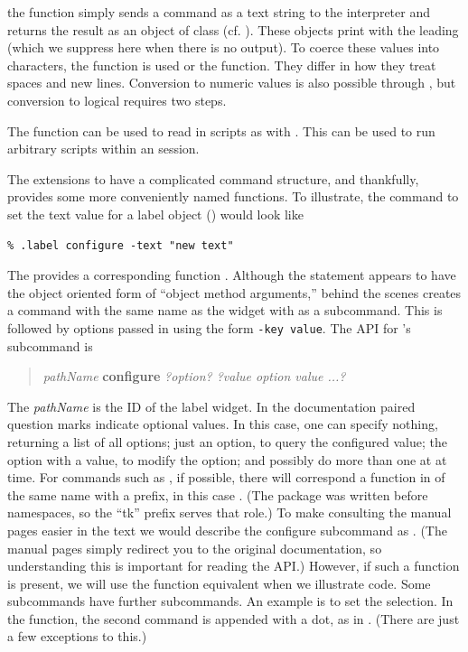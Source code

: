 the  function simply sends a command as a text string
to the \TCL\/ interpreter and returns the result as an object of class
 (cf. ). These objects print with the leading
 (which we suppress here when there is no output). To coerce
these values into characters, the  function is used or the  function. They differ in how they treat spaces and new lines. 
Conversion to numeric values is also possible through , but conversion to logical requires two steps.

The  function can be used to read in \TCL\/ scripts as with . This can be used to run arbitrary \TCL\/ scripts within an \R\/ session.

The \TK\/ extensions to \TCL\/ have a complicated command structure, and thankfully,  provides some more conveniently named functions. To illustrate, the \TCL\/ command to set the text value for a label object () would look like
\begin{verbatim}
% .label configure -text "new text"
\end{verbatim}
The  provides a corresponding function . 
Although the \TCL\/ statement appears to have the object oriented form of ``object method arguments,'' behind the scenes \TCL\/ creates a command with the same name as the widget with
 as a subcommand. This is followed by options 
passed in using the form \texttt{-key value}.  The \TK\/ API for 's  subcommand is

\begin{quotation}
  \textit{pathName} \textbf{configure} \textit{?option? ?value option value ...?}
\end{quotation}

The \textit{pathName} is the ID of the label widget. In the \TK\/ documentation
paired question marks indicate optional values. In this case, one can
specify nothing, returning a list of all options; just an option, to query the configured value; the option
with a value, to modify the option; and possibly do more than one at at time.
For commands such as , if possible, there will correspond a
function in \R\/ of the same name with a  prefix, in this case
.  (The package  was written before
namespaces, so the ``tk'' prefix serves that role.) To make consulting the \TK\/ manual pages easier in the text we would describe the configure subcommand as . (The \R\/ manual pages simply redirect you to the original \TK\/ documentation, so understanding this is important for reading the API.) However, if such a function is present, we will use the \R\/ function equivalent when we illustrate code. Some subcommands have further subcommands. An example is to set the selection. In the \R\/ function, the second command is appended with a dot, as in . (There are just a few exceptions to this.)

